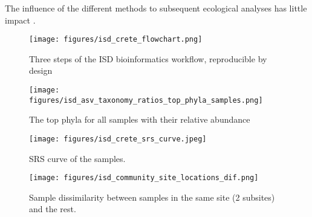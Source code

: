 The influence of the different methods to subsequent ecological analyses has
little impact \parencite{Glassman2018}.

   \begin{figure}[h]
      \centering
      \texttt{[image: figures/isd\_crete\_flowchart.png]}
      \caption[Reproducible workflow of ISD analysis]{Three steps of the ISD bioinformatics workflow, reproducible by design}
      \label{fig:isd_workflow_taxonomy}
   \end{figure}
   
   \begin{figure}[h]
      \centering
      \texttt{[image: figures/isd\_asv\_taxonomy\_ratios\_top\_phyla\_samples.png]}
      \caption[Top phyla of each samples]{The top phyla for all samples with their relative abundance}
      \label{fig:isd_top_phyla_samples}
   \end{figure}
   
   \begin{figure}[h]
      \centering
      \texttt{[image: figures/isd\_crete\_srs\_curve.jpeg]}
      \caption[SRS curve]{SRS curve of the samples. }
      \label{fig:isd_srs-curve_samples}
   \end{figure}

\begin{figure}[t] 
    \centering\texttt{[image: figures/isd\_community\_site\_locations\_dif.png]}
\caption{Sample dissimilarity between samples in the same site (2 subsites) and the rest.}
    \label{fig:isd_site_locations}
\end{figure}

